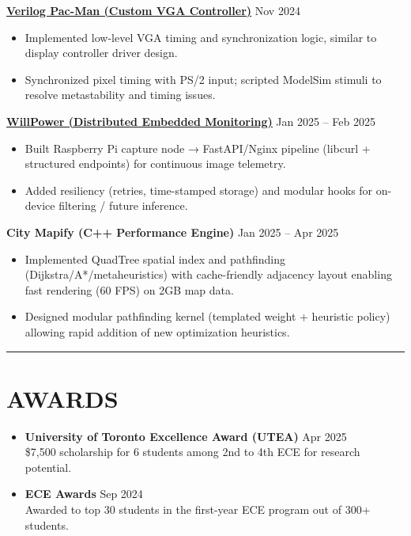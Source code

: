 \documentclass[letterpaper,10pt]{article}
\begin{document}
\noindent\noindent\href{https://github.com/Ken-2511/ECE241-Project}{\uline{
    \textbf{Verilog Pac-Man (Custom VGA Controller)}}} \hfill Nov 2024
\begin{itemize}[leftmargin=0.2in]
  \item Implemented low-level VGA timing and synchronization logic, similar to display controller driver design.
  \item Synchronized pixel timing with PS/2 input; scripted ModelSim stimuli to resolve metastability and timing issues.
\end{itemize}

\noindent\noindent\href{https://github.com/Ken-2511/WillPower}{\uline{
    \textbf{WillPower (Distributed Embedded Monitoring)}}} \hfill Jan 2025 -- Feb 2025
\begin{itemize}[leftmargin=0.2in]
  \item Built Raspberry Pi capture node → FastAPI/Nginx pipeline (libcurl + structured endpoints) for continuous image telemetry.
  \item Added resiliency (retries, time-stamped storage) and modular hooks for on-device filtering / future inference.
\end{itemize}

\noindent\textbf{City Mapify (C++ Performance Engine)} \hfill Jan 2025 -- Apr 2025
\begin{itemize}[leftmargin=0.2in]
  \item Implemented QuadTree spatial index and pathfinding (Dijkstra/A*/metaheuristics) with cache-friendly adjacency layout enabling fast rendering (60 FPS) on 2GB map data.
  \item Designed modular pathfinding kernel (templated weight + heuristic policy) allowing rapid addition of new optimization heuristics.
\end{itemize}

\noindent\rule{\linewidth}{1pt}

\section*{\textbf{AWARDS}}
\begin{itemize}[leftmargin=0.2in]
	\item \textbf{University of Toronto Excellence Award (UTEA)} \hfill Apr 2025\\
    \$7,500 scholarship for 6 students among 2nd to 4th ECE for research potential.
	\item \textbf{ECE Awards} \hfill Sep 2024\\
	Awarded to top 30 students in the first-year ECE program out of 300+ students.
\end{itemize}
\end{document}
